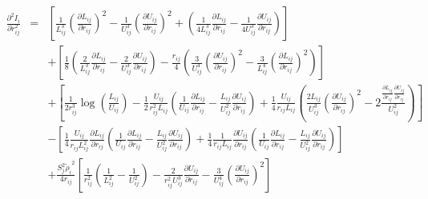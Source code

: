 \documentclass[12pt]{article}
\begin{document}
\begin{eqnarray}
\label{eq:BurialTerm2ndDerv}
\frac{\partial^{2}I_{i}}{\partial r_{ij}^{2}} & = & \left[ \frac{1}{L_{ij}^{3}}\left(\frac{\partial L_{ij}}{\partial r_{ij}}\right)^{2}
- \frac{1}{U_{ij}^{3}}\left(\frac{\partial U_{ij}}{\partial r_{ij}}\right)^{2} + \left(\frac{1}{4L_{ij}^{3}}\frac{\partial L_{ij}}{\partial r_{ij}} - \frac{1}{4U_{ij}^{3}}\frac{\partial U_{ij}}{\partial r_{ij}} \right)\right] \\ \nonumber
& & +  \left[ \frac{1}{8}\left(\frac{2}{L_{ij}^{3}} \frac{\partial L_{ij}}{\partial r_{ij}} - \frac{2}{U_{ij}^{3}} \frac{\partial U_{ij}}{\partial r_{ij}} \right) - \frac{r_{ij}}{4}\left(\frac{3}{U_{ij}^{4}}\left(\frac{\partial U_{ij}}{\partial r_{ij}} \right)^{2}    - \frac{3}{L_{ij}^{4}}\left(\frac{\partial L_{ij}}{\partial r_{ij}} \right)^{2} \right)\right] \\ \nonumber
& & + \left[ \frac{1}{2r_{ij}^{3}}\log(\frac{L_{ij}}{U_{ij}}) - \frac{1}{2} \frac{U_{ij}}{r_{ij}^{2}L_{ij}} \left( \frac{1}{U_{ij}}\frac{\partial L_{ij}}{\partial r_{ij}} - \frac{L_{ij}}{U_{ij}^{2}}\frac{\partial U_{ij}}{\partial r_{ij}} \right)
+\frac{1}{4}\frac{U_{ij}}{r_{ij}L_{ij}}\left(\frac{2L_{ij}}{U_{ij}^{3}}\left(\frac{\partial U_{ij}}{\partial r_{ij}}\right)^{2} - 2\frac{\frac{\partial L_{ij}}{\partial r_{ij}}\frac{\partial U_{ij}}{\partial r_{ij}}}{U_{ij}^{2}} \right) \right] \\ \nonumber
& & - \left[ \frac{1}{4}\frac{U_{ij}}{r_{ij}L_{ij}^2}\frac{\partial L_{ij}}{\partial r_{ij}}\left( \frac{1}{U_{ij}}\frac{\partial L_{ij}}{\partial r_{ij}} - \frac{L_{ij}}{U_{ij}^{2}}\frac{\partial U_{ij}}{\partial r_{ij}} \right) +  \frac{1}{4}\frac{1}{r_{ij}L_{ij}}\frac{\partial U_{ij}}{\partial r_{ij}}\left(\frac{1}{U_{ij}}\frac{\partial L_{ij}}{\partial r_{ij}} - \frac{L_{ij}}{U_{ij}^{2}}\frac{\partial U_{ij}}{\partial r_{ij}} \right) \right] \\ \nonumber
& & + \frac{S_{j}^{2}{{\tilde{\rho}_{i}}}^{2}}{4r_{ij}}\left[\frac{1}{r_{ij}^2}\left(\frac{1}{L_{ij}^2} - \frac{1}{U_{ij}^2} \right) - \frac{2}{r_{ij}^{2}U_{ij}^{3}}\frac{\partial U_{ij}}{\partial r_{ij}} - \frac{3}{U_{ij}^{4}}\left( \frac{\partial U_{ij}}{\partial r_{ij}}\right)^{2} \right] \\ \nonumber
\end{eqnarray}
\end{document}
